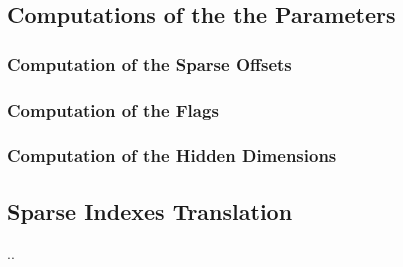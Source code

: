 \subsection{Computations of the the Parameters}
\subsubsection{Computation of the Sparse Offsets}
\subsubsection{Computation of the Flags}
\subsubsection{Computation of the Hidden Dimensions}

\subsection{Sparse Indexes Translation}
..